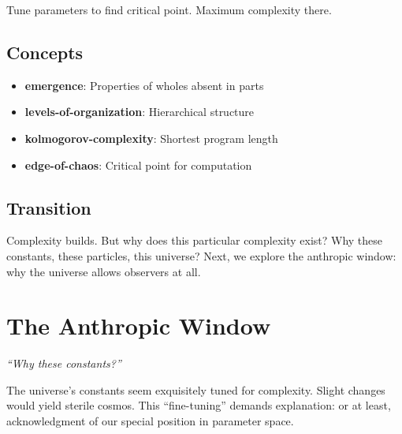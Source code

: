 \documentclass[
  11pt,
  letterpaper,
  twoside,
  openright]{book}
\providecommand{\tightlist}{%
  \setlength{\itemsep}{0pt}\setlength{\parskip}{0pt}}
\begin{document}
Tune parameters to find critical point. Maximum complexity there.

\section{Concepts}\label{concepts-40}

\begin{itemize}
\tightlist
\item
  \textbf{emergence}: Properties of wholes absent in parts
\item
  \textbf{levels-of-organization}: Hierarchical structure
\item
  \textbf{kolmogorov-complexity}: Shortest program length
\item
  \textbf{edge-of-chaos}: Critical point for computation
\end{itemize}

\section{Transition}\label{transition-41}

Complexity builds. But why does this particular complexity exist? Why
these constants, these particles, this universe? Next, we explore the
anthropic window: why the universe allows observers at all.

\chapter{The Anthropic Window}\label{sec-anthropic-window}

\emph{``Why these constants?''}

\begin{tcolorbox}[enhanced jigsaw, leftrule=.75mm, title=\textcolor{quarto-callout-note-color}{\faInfo}\hspace{0.5em}{Key Revelation}, bottomrule=.15mm, opacityback=0, coltitle=black, arc=.35mm, colframe=quarto-callout-note-color-frame, colbacktitle=quarto-callout-note-color!10!white, colback=white, titlerule=0mm, breakable, bottomtitle=1mm, toptitle=1mm, rightrule=.15mm, toprule=.15mm, left=2mm, opacitybacktitle=0.6]

The universe's constants seem exquisitely tuned for complexity. Slight
changes would yield sterile cosmos. This ``fine-tuning'' demands
explanation: or at least, acknowledgment of our special position in
parameter space.

\end{tcolorbox}
\end{document}
